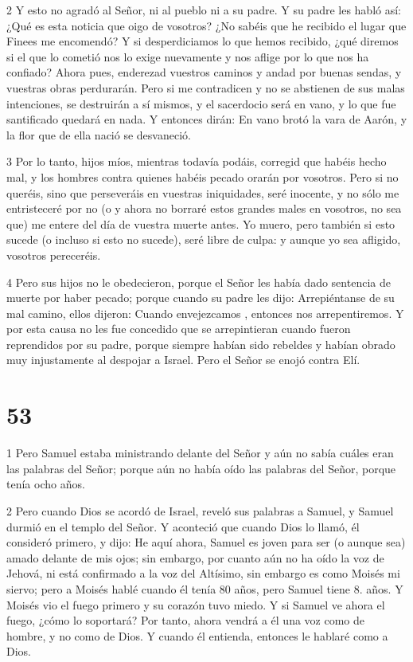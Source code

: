 \par 2 Y esto no agradó al Señor, ni al pueblo ni a su padre. Y su padre les habló así: ¿Qué es esta noticia que oigo de vosotros? ¿No sabéis que he recibido el lugar que Finees me encomendó? Y si desperdiciamos lo que hemos recibido, ¿qué diremos si el que lo cometió nos lo exige nuevamente y nos aflige por lo que nos ha confiado? Ahora pues, enderezad vuestros caminos y andad por buenas sendas, y vuestras obras perdurarán. Pero si me contradicen y no se abstienen de sus malas intenciones, se destruirán a sí mismos, y el sacerdocio será en vano, y lo que fue santificado quedará en nada. Y entonces dirán: En vano brotó la vara de Aarón, y la flor que de ella nació se desvaneció.

\par 3 Por lo tanto, hijos míos, mientras todavía podáis, corregid que habéis hecho mal, y los hombres contra quienes habéis pecado orarán por vosotros. Pero si no queréis, sino que perseveráis en vuestras iniquidades, seré inocente, y no sólo me entristeceré por no (o y ahora no borraré estos grandes males en vosotros, no sea que) me entere del día de vuestra muerte antes. Yo muero, pero también si esto sucede (o incluso si esto no sucede), seré libre de culpa: y aunque yo sea afligido, vosotros pereceréis.

\par 4 Pero sus hijos no le obedecieron, porque el Señor les había dado sentencia de muerte por haber pecado; porque cuando su padre les dijo: Arrepiéntanse de su mal camino, ellos dijeron: Cuando envejezcamos , entonces nos arrepentiremos. Y por esta causa no les fue concedido que se arrepintieran cuando fueron reprendidos por su padre, porque siempre habían sido rebeldes y habían obrado muy injustamente al despojar a Israel. Pero el Señor se enojó contra Elí.

\chapter{53}

\par 1 Pero Samuel estaba ministrando delante del Señor y aún no sabía cuáles eran las palabras del Señor; porque aún no había oído las palabras del Señor, porque tenía ocho años.

\par 2 Pero cuando Dios se acordó de Israel, reveló sus palabras a Samuel, y Samuel durmió en el templo del Señor. Y aconteció que cuando Dios lo llamó, él consideró primero, y dijo: He aquí ahora, Samuel es joven para ser (o aunque sea) amado delante de mis ojos; sin embargo, por cuanto aún no ha oído la voz de Jehová, ni está confirmado a la voz del Altísimo, sin embargo es como Moisés mi siervo; pero a Moisés hablé cuando él tenía 80 años, pero Samuel tiene 8. años. Y Moisés vio el fuego primero y su corazón tuvo miedo. Y si Samuel ve ahora el fuego, ¿cómo lo soportará? Por tanto, ahora vendrá a él una voz como de hombre, y no como de Dios. Y cuando él entienda, entonces le hablaré como a Dios.

